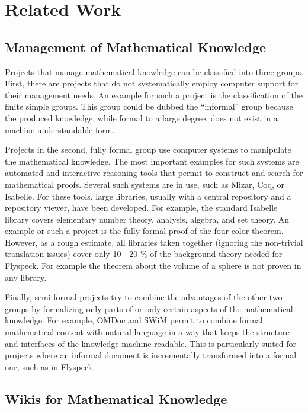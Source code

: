 \section{Related Work}
\label{sec:related}


\subsection{Management of Mathematical Knowledge}
\label{sec:mkm}

Projects that manage mathematical knowledge can be classified into three groups.  First, there are projects that do not systematically employ computer support for their management needs.  An example for such a project is the classification of the finite simple groups\cite{Gorenstein-Lyons-Salomon:1994}.  This group could be dubbed the ``informal'' group because the produced knowledge, while formal to a large degree, does not exist in a machine-understandable form.

Projects in the second, fully formal group use computer systems to manipulate the mathematical knowledge.  The most important examples for such systems are automated and interactive reasoning tools that permit to construct and search for mathematical proofs. Several such systems are in use, such as Mizar\cite{mizarmanual}, Coq\cite{Coq}, or Isabelle\cite{Isabelle}.  For these tools, large libraries, usually with a central repository and a repository viewer, have been developed.  For example, the standard Isabelle library covers elementary number theory, analysis, algebra, and set theory. An example or such a project is the fully formal proof of the four color theorem\cite{Gonthier:FourColor}. However, as a rough estimate, all libraries taken together (ignoring the non-trivial translation issues) cover only 10 - 20 \% of the background theory needed for Flyspeck. For example the theorem about the volume of a sphere is not proven in any library.

Finally, semi-formal projects try to combine the advantages of the other two groups by formalizing only parts of or only certain aspects of the mathematical knowledge.  For example, OMDoc and SWiM permit to combine formal mathematical content with natural language in a way that keeps the structure and interfaces of the knowledge machine-readable.  This is particularly suited for projects where an informal document is incrementally transformed into a formal one, such as in Flyspeck.

\subsection{Wikis for Mathematical Knowledge}
\label{sec:math-wiki}

